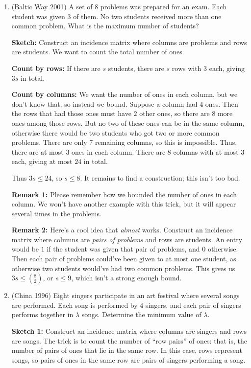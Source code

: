 \documentclass[11pt,paper=letter]{scrartcl}
\newcommand{\cbyrows}{{\bfseries \color{RowBlue} Count by rows: }}
\newcommand{\cbycols}{{\bfseries \color{ColOrange} Count by columns: }}
\begin{document}
\begin{enumerate}

\item (Baltic Way 2001) A set of $8$ problems was prepared for an exam. Each student was given $3$ of them. No two students received more than one common problem. What is the maximum number of students?

\textbf{Sketch:} Construct an incidence matrix where columns are problems and rows are students. We want to count the total number of ones.

\cbyrows If there are $s$ students, there are $s$ rows with $3$ each, giving $3s$ in total.

\cbycols We want the number of ones in each column, but we don't know that, so instead we bound. Suppose a column had $4$ ones. Then the rows that had those ones must have $2$ other ones, so there are $8$ more ones among those rows. But no two of these ones can be in the same column, otherwise there would be two students who got two or more common problems. There are only $7$ remaining columns, so this is impossible. Thus, there are at most $3$ ones in each column. There are $8$ columns with at most $3$ each, giving at most $24$ in total.

Thus $3s \le 24$, so $s \le 8$. It remains to find a construction; this isn't too bad.

\textbf{Remark 1:} Please remember how we bounded the number of ones in each column. We won't have another example with this trick, but it will appear several times in the problems.

\textbf{Remark 2:} Here's a cool idea that \textit{almost} works. Construct an incidence matrix where columns are \textit{pairs of problems} and rows are students. An entry would be $1$ if the student was given that pair of problems, and $0$ otherwise. Then each pair of problems could've been given to at most one student, as otherwise two students would've had two common problems. This gives us $3s \le \binom 82$, or $s \le 9$, which isn't a strong enough bound.




\item (China 1996) Eight singers participate in an art festival where several songs are performed. Each song is performed by $4$ singers, and each pair of singers performs together in $\lambda$ songs. Determine the minimum value of $\lambda$.

\textbf{Sketch 1:} Construct an incidence matrix where columns are singers and rows are songs. The trick is to count the number of ``row pairs'' of ones: that is, the number of pairs of ones that lie in the same row. In this case, rows represent songs, so pairs of ones in the same row are pairs of singers performing a song.


\end{enumerate}
\end{document}

